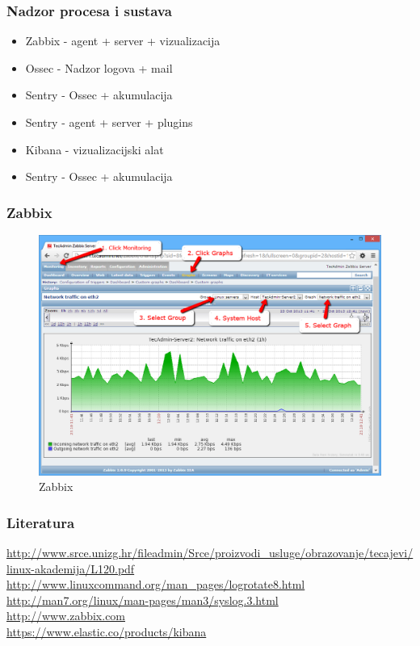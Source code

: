 \documentclass[t,table,usenames,dvipsnames]{beamer}
\begin{document}
\begin{frame}
	\frametitle{Nadzor procesa i sustava}
	
	\begin{itemize}
		\item Zabbix - agent + server + vizualizacija
        \item Ossec - Nadzor logova + mail
        \item Sentry - Ossec + akumulacija
		\item Sentry - agent + server + plugins
		\item Kibana - vizualizacijski alat
		\item Sentry - Ossec + akumulacija
	\end{itemize}
	
\end{frame}

\begin{frame}
	\frametitle{Zabbix}
	\begin{figure}
		\centering
		\includegraphics[width=0.7\linewidth]{graph-network}
		\caption{Zabbix}
		\label{fig:graph-network}
	\end{figure}
	
\end{frame}


\begin{frame}
	\frametitle{Literatura}
	\url{http://www.srce.unizg.hr/fileadmin/Srce/proizvodi_usluge/obrazovanje/tecajevi/linux-akademija/L120.pdf}
	\vfill
	\url{http://www.linuxcommand.org/man_pages/logrotate8.html}\\
	\url{http://man7.org/linux/man-pages/man3/syslog.3.html}\\
	\vfill
	\url{http://www.zabbix.com}\\
	\vfill
	\url{https://www.elastic.co/products/kibana}\\
\end{frame}
\end{document}
